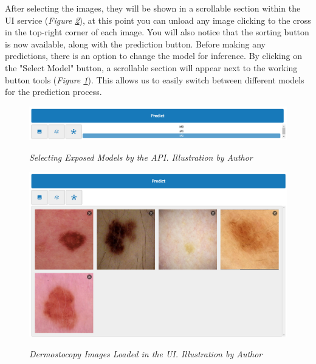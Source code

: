 After selecting the images, they will be shown in a scrollable section within
the UI service (\textit{Figure \ref{fig:loaded-images}}), at this point you can
unload any image clicking to the cross in the top-right corner of each image.
You will also notice that the sorting button is now available, along with the
prediction button. Before making any predictions, there is an option to change
the model for inference. By clicking on the "Select Model" button, a scrollable
section will appear next to the working button tools (\textit{Figure
\ref{fig:selecting-model}}). This allows us to easily switch between different
models for the prediction process.

\begin{figure}[H]
  \centering
  \includegraphics[width=\textwidth]{imatges/results/selecting-model.png}
  \caption[Selecting Exposed Models by the API]{\textit{Selecting Exposed Models by the API. Illustration by Author}}
  {\label{fig:selecting-model}}
\end{figure}


\begin{figure}[H]
  \centering
  \begin{adjustbox}{width=\textwidth, trim={0cm 3.5cm 0cm 0cm}, clip}
    \includegraphics[width=\textwidth]{imatges/results/loaded-images.png}
  \end{adjustbox}
  \caption[Dermostocopy Images Loaded in the UI]{\textit{Dermostocopy Images Loaded in the UI. Illustration by Author}}
  {\label{fig:loaded-images}}
\end{figure}


